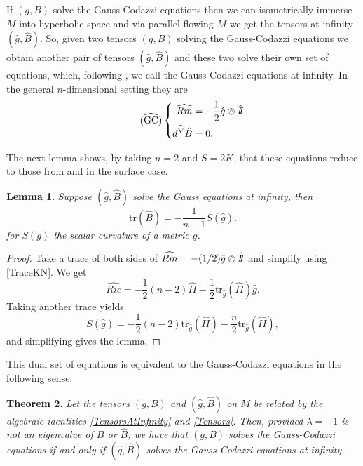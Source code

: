 \documentclass{amsart}
\newcommand{\two}{I\!\!I}
\newcommand{\tr}{\mathrm{tr}}
\newtheorem{thm}{Theorem}[section]
\newtheorem{lem}[thm]{Lemma}
\begin{document}
If $(g,B)$ solve the Gauss-Codazzi equations then we can isometrically immerse $M$ into hyperbolic space and via parallel flowing $M$ we get the tensors at infinity $(\hat{g},\hat{B})$.
So, given two tensors $(g,B)$ solving the Gauss-Codazzi equations we obtain another pair of tensors $(\hat{g},\hat{B})$ and these two solve their own set of equations, which, following \cite{Krasnov-Schlenker2007}, we call the Gauss-Codazzi equations at infinity.
In the general $n$-dimensional setting they are 
\begin{equation}
\label{GCInf} \tag{$\widehat{\text{GC}}$}
\left\{
\begin{aligned}
\widehat{Rm} &= -\frac{1}{2} \hat{g} \owedge \hat{\two} \\
d^{\widehat{\nabla}} \hat{B} &= 0.
\end{aligned}
\right.
\end{equation}

The next lemma shows, by taking $n=2$ and $S = 2K$, that these equations reduce to those from \cite{Krasnov-Schlenker2008} and \cite{Bridgeman-Bromberg2022} in the surface case.

\begin{lem}
\label{TraceScalarCurv}
Suppose $(\hat{g},\hat{B})$ solve the Gauss equations at infinity, then 
\[
\tr(\hat{B}) = -\frac{1}{n-1}S(\hat{g}).
\]
for $S(g)$ the scalar curvature of a metric $g$.
\end{lem}

\begin{proof}
Take a trace of both sides of $\widehat{Rm} = -(1/2)\hat{g}\owedge\hat{\two}$ and simplify using \eqref{TraceKN}.
We get
\[
\hat{Ric} = -\frac{1}{2}(n-2)\hat{\two} -\frac{1}{2}\tr_{\hat{g}}(\hat{\two})\hat{g}.
\]
Taking another trace yields
\[
S(\hat{g}) = -\frac{1}{2}(n-2)\tr_{\hat{g}}(\hat{\two}) - \frac{n}{2}\tr_{\hat{g}}(\hat{\two}),
\]
and simplifying gives the lemma.
\end{proof}


This dual set of equations is equivalent to the Gauss-Codazzi equations in the following sense.


\begin{thm}
\label{DualEquations}
Let the tensors $(g,B)$ and $(\hat{g},\hat{B})$ on $M$ be related by the algebraic identities \eqref{TensorsAtInfinity} and \eqref{Tensors}. 
Then, provided $\lambda =-1$ is not an eigenvalue of $B$ or $\hat{B}$, we have that $(g,B)$ solves the Gauss-Codazzi equations if and only if $(\hat{g},\hat{B})$ solves the Gauss-Codazzi equations at infinity.
\end{thm}
\end{document}
